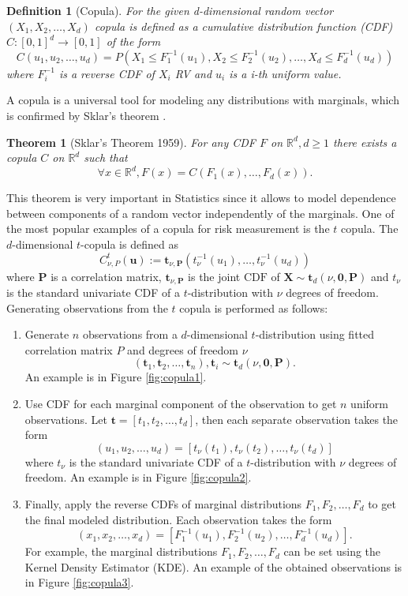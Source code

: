 \documentclass{article}
\newtheorem{definition}{Definition}[section]
\newtheorem{theorem}{Theorem}[section]
\begin{document}
\begin{definition}[Copula]
    For the given d-dimensional random vector $(X_1, X_2, \dots, X_d)$ copula is defined as a cumulative distribution function (CDF) $C: [0, 1]^d \to [0, 1]$ of the form
    $$C(u_1, u_2, \dots, u_d) = P(X_1 \leq F_1^{-1}(u_1), X_2 \leq F_2^{-1}(u_2), \dots, X_d \leq F_d^{-1}(u_d))$$
    where $F^{-1}_i$ is a reverse CDF of $X_i$ RV and $u_i$ is a i-th uniform value.
\end{definition}

A copula is a universal tool for modeling any distributions with marginals, which is confirmed by Sklar's theorem \cite{lo2018simple}.
\begin{theorem}[Sklar’s Theorem 1959]
    For any CDF $F$ on $\mathbb R^d, d \geq 1$ there exists a copula $C$ on $\mathbb R^d$ such that
    $$\forall x\in \mathbb R^d, F(x) = C(F_1(x), \dots, F_d(x)).$$
\end{theorem}

This theorem is very important in Statistics since it allows to model dependence between components of a random vector independently of the marginals. One of the most popular examples of a copula for risk measurement is the $t$ copula. The $d$-dimensional $t$-copula is defined as
$$
C_{\nu, P}^{t}(\mathbf{u}):=\mathbf{t}_{\nu, \mathbf{P}}\left(t_{\nu}^{-1}\left(u_{1}\right), \ldots, t_{\nu}^{-1}\left(u_{d}\right)\right)
$$
where $\mathbf{P}$ is a correlation matrix, $\mathbf{t}_{\nu, \mathbf{P}}$ is the joint $\mathrm{CDF}$ of $\mathbf{X} \sim \mathbf{t}_{d}(\nu, \mathbf{0}, \mathbf{P})$ and $t_{\nu}$ is the standard univariate CDF of a $t$-distribution with $\nu$ degrees of freedom. Generating observations from the $t$ copula is performed as follows:

\begin{enumerate}
    \item Generate $n$ observations from a $d$-dimensional $t$-distribution using fitted correlation matrix $P$ and degrees of freedom $\nu$
    $$(\mathbf{t}_1, \mathbf{t}_2, \dots, \mathbf{t}_n), \mathbf{t}_i \sim \mathbf t_d(\nu, \mathbf{0}, \mathbf{P} ).$$
    An example is in Figure \ref{fig:copula1}.
    \item Use CDF for each marginal component of the observation to get $n$ uniform observations. Let $\mathbf{t} = [t_{1}, t_{2}, \dots, t_{d}]$, then each separate observation takes the form
    $$(u_1, u_2, \dots, u_d) = \left[t_{\nu}(t_{1}), t_{\nu}(t_{2}), \dots, t_{\nu}(t_{d})\right]$$
    where $t_{\nu}$ is the standard univariate CDF of a $t$-distribution with $\nu$ degrees of freedom. An example is in Figure \ref{fig:copula2}.
    \item Finally, apply the reverse CDFs of marginal distributions $F_1, F_2, \dots, F_d$ to get the final modeled distribution. Each observation takes the form
    $$(x_1, x_2, \dots, x_d) = \left[ F_1^{-1}(u_1), F_2^{-1}(u_2), \dots, F_d^{-1}(u_d) \right].$$
    For example, the marginal distributions $F_1, F_2, \dots, F_d$ can be set using the Kernel Density Estimator (KDE). An example of the obtained observations is in Figure \ref{fig:copula3}.
\end{enumerate}
\end{document}
